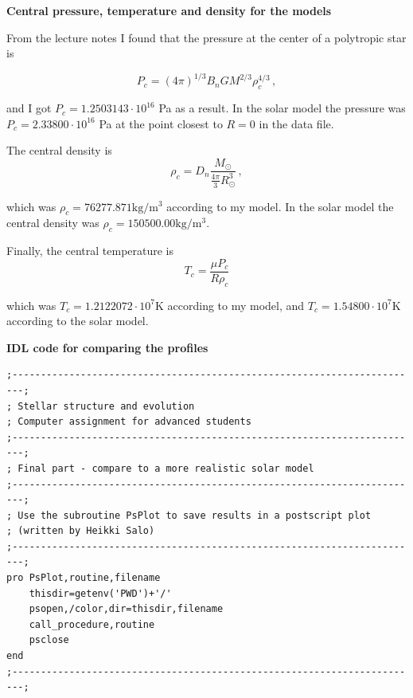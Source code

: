 \documentclass[a4paper,12pt]{article}
\begin{document}
\begin{itemize}




\textbf{Central pressure, temperature and density for the models}

From the lecture notes I found that the pressure at the center of a polytropic star is

\begin{equation}
P_c=(4\pi)^{1/3} B_n G M^{2/3} \rho_c^{4/3} \, ,
\end{equation}

and I got $P_c=1.2503143 \cdot 10^{16}$ Pa as a result. In the solar model the pressure was $P_c=2.33800 \cdot 10^{16}$ Pa at the point closest to $R=0$ in the data file.

The central density is
\begin{equation}
\rho_c=D_n \frac{M_{\odot}}{\frac{4\pi}{3}R_{\odot}^3} \, ,
\end{equation}

which was $\rho_c=76277.871 \text{kg}/\text{m}^3$ according to my model. In the solar model the central density was $\rho_c=150500.00\text{kg}/\text{m}^3$.

Finally, the central temperature is
\begin{equation}
T_c=\frac{\mu P_c}{\textit{R}\rho_c}
\end{equation}

which was $T_c=1.2122072\cdot10^7$K according to my model, and $T_c=1.54800\cdot10^7$K according to the solar model.

\newpage
\textbf{IDL code for comparing the profiles}

\begin{scriptsize}
\begin{verbatim}
;------------------------------------------------------------------------;
; Stellar structure and evolution
; Computer assignment for advanced students
;------------------------------------------------------------------------;
; Final part - compare to a more realistic solar model
;------------------------------------------------------------------------;
; Use the subroutine PsPlot to save results in a postscript plot 
; (written by Heikki Salo)
;------------------------------------------------------------------------;
pro PsPlot,routine,filename
	thisdir=getenv('PWD')+'/'
	psopen,/color,dir=thisdir,filename
	call_procedure,routine
	psclose		
end
;------------------------------------------------------------------------;


\end{verbatim}
\end{scriptsize}
\end{itemize}
\end{document}
